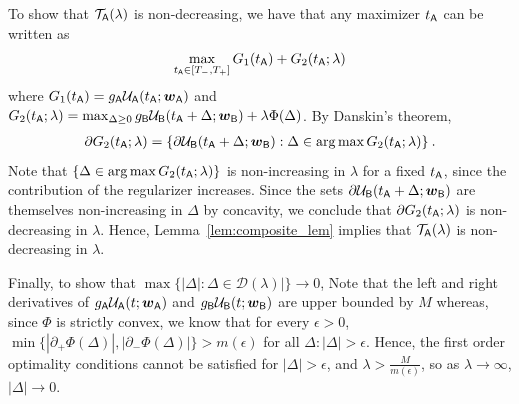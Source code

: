 	To show that $\mathcal{T}_{\mathsf{A}}(\lambda)$ is non-decreasing, we have that any maximizer $t_{\mathsf{A}}$ can be written as 
	\begin{eqnarray*}
	\max_{t_{\mathsf{A}} \in [T_-,T_+]} G_1(t_{\mathsf{A}}) + G_2(t_{\mathsf{A}};\lambda)
	\end{eqnarray*}
	where $G_1(t_{\mathsf{A}}) = g_{\mathsf{A}} \mathcal{U}_{\mathsf{A}}(t_{\mathsf{A}};\boldsymbol{w}_{\mathsf{A}}) $ and $ G_2(t_{\mathsf{A}};\lambda) = \max_{\Delta \ge 0}  g_{\mathsf{B}} \mathcal{U}_{\mathsf{B}}(t_{\mathsf{A}} + \Delta;\boldsymbol{w}_{\mathsf{B}}) + \lambda \Phi(\Delta)$. By Danskin's theorem,
	\begin{eqnarray*}
	\partial G_2(t_{\mathsf{A}};\lambda) = \{\partial  \mathcal{U}_{\mathsf{B}}(t_{\mathsf{A}} + \Delta;\boldsymbol{w}_{\mathsf{B}}) : \Delta \in \arg\max G_2(t_{\mathsf{A}};\lambda) \}\:.
	\end{eqnarray*} 
	Note that $\{\Delta \in \arg\max G_2(t_{\mathsf{A}};\lambda)\}$ is non-increasing in $\lambda$ for a fixed $t_{\mathsf{A}}$, since the contribution of the regularizer increases. Since the sets  $\partial  \mathcal{U}_{\mathsf{B}}(t_{\mathsf{A}} + \Delta;\boldsymbol{w}_{\mathsf{B}})$ are themselves non-increasing in $\Delta$ by concavity, we conclude that $\partial G_2(t_{\mathsf{A}};\lambda)$ is non-decreasing in $\lambda$. Hence, Lemma~\ref{lem:composite_lem} implies that $\mathcal{T}_{\mathsf{A}}(\lambda)$ is non-decreasing in $\lambda$.

	Finally, to show that $\max\{|\Delta|:\Delta \in \mathcal{D}(\lambda)|\} \to 0$,   	Note that the left and right derivatives of $g_{\mathsf{A}} \mathcal{U}_{\mathsf{A}}(t;\boldsymbol{w}_{\mathsf{A}})$ and $ g_{\mathsf{B}} \mathcal{U}_{\mathsf{B}}(t;\boldsymbol{w}_{\mathsf{B}})$ are upper bounded by $M$ whereas, since $\Phi$ is strictly convex, we know that for every $\epsilon > 0$, $\min\{|\partial_+ \Phi(\Delta)|,|\partial_- \Phi(\Delta)|\} > m(\epsilon)$ for all $\Delta:|\Delta| > \epsilon$. Hence, the first order optimality conditions cannot be satisfied for $|\Delta| > \epsilon$, and $\lambda > \frac{M}{m(\epsilon)}$, so as $\lambda \to \infty$, $|\Delta| \to 0$.
	
